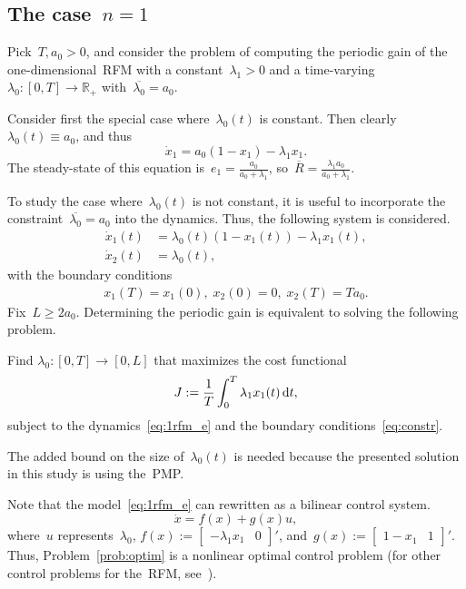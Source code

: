\subsection{The case~$n=1$}

Pick~$T,a_0>0$, and consider the problem of computing the periodic gain of the one-dimensional~RFM with a constant~$\lambda_1>0$ and a time-varying~$\lambda_0:[0,T]\to \mathbb{R}_+$
with~$\overline{\lambda_0}=a_0$. 

Consider first the special  case where~$\lambda_0(t)$  is constant.
Then  clearly~$\lambda_0(t) \equiv a_0$, and thus
%
\begin{equation}
	\dot x_1=a_0(1-x_1)-\lambda_1 x_1.
\end{equation}
%
The steady-state of this equation is~$e_1=\frac{a_0}{a_0+\lambda_1}$, so~$\overline R=\frac{\lambda_1 a_0}{a_0+\lambda_1}$. 

To study the  case where~$\lambda_0(t)$ is not constant, it is useful to incorporate  the constraint~$\overline{\lambda_0}=a_0$ into the dynamics. 
Thus, the following system is considered. 
%
\begin{subequations} \label{eq:1rfm_e}
	\begin{align}
		\dot x_1(t)&=\lambda_0(t) (1-x_1(t)) -\lambda_1 x_1(t),  \\
		\dot x_2(t)&=\lambda_0(t),
	\end{align}
\end{subequations}
%
with the boundary conditions 
%
\begin{align} \label{eq:constr}
	x_1(T)=x_1(0),\;x_2(0)=0,\;    x_2(T)=T a_0. 
\end{align}
%
Fix~$L \geq 2 a_0 $. 
Determining the periodic gain is equivalent to solving the following problem.

\begin{problem} \label{prob:optim}
	Find $\lambda_0 : [0,T] \to [0,L]$ that maximizes the cost functional
	\begin{equation}
		J:=\frac{1}{T}\int_0^T \lambda_1 x_1(t) \mathop{}\!\mathrm{d} t,
	\end{equation}
	subject to the dynamics~\eqref{eq:1rfm_e} and the boundary 
	conditions~\eqref{eq:constr}.
\end{problem}
%
The added bound on the size of~$\lambda_0(t)$ is needed because the presented solution in this study is using the~\ac{PMP}.

Note that the model~\eqref{eq:1rfm_e} can rewritten as a bilinear control  system.
%
\begin{equation}\label{eq:vec1rfm_e}
	\dot x=f(x)+g(x) u, 
\end{equation}
%
where~$u$ represents~$\lambda_0$,
$f(x):=\begin{bmatrix}
-\lambda_1 x_1 & 0 \end{bmatrix}' $,
and~$g(x):=\begin{bmatrix} 1-x_1 & 1\end{bmatrix}'$.
Thus, Problem~\ref{prob:optim} is a nonlinear optimal control problem (for other control problems for the~\ac{RFM}, see~\cite{zarai2018controllability}).  

